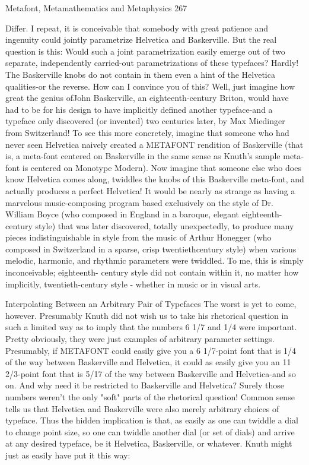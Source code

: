 Metafont, Metamathematics and Metaphysics                                                 267

Differ. I repeat, it is conceivable that somebody with great patience and ingenuity could
jointly parametrize Helvetica and Baskerville. But the real question is this: Would such a
joint parametrization easily emerge out of two separate, independently carried-out
parametrizations of these typefaces?
   Hardly! The Baskerville knobs do not contain in them even a hint of the Helvetica
qualities-or the reverse. How can I convince you of this? Well, just imagine how great the
genius ofJohn Baskerville, an eighteenth-century Briton, would have had to be for his
design to have implicitly defined another typeface-and a typeface only discovered (or
invented) two centuries later, by Max Miedinger from Switzerland! To see this more
concretely, imagine that someone who had never seen Helvetica naively created a
METAFONT rendition of Baskerville (that is, a meta-font centered on Baskerville in the
same sense as Knuth's sample meta-font is centered on Monotype Modern). Now imagine
that someone else who does know Helvetica comes along, twiddles the knobs of this
Baskerville meta-font, and actually produces a perfect Helvetica! It would be nearly as
strange as having a marvelous music-composing program based exclusively on the style
of Dr. William Boyce (who composed in England in a baroque, elegant eighteenth-
century style) that was later discovered, totally unexpectedly, to produce many pieces
indistinguishable in style from the music of Arthur Honegger (who composed in
Switzerland in a sparse, crisp twentiethcentury style) when various melodic, harmonic,
and rhythmic parameters were twiddled. To me, this is simply inconceivable; eighteenth-
century style did not contain within it, no matter how implicitly, twentieth-century style -
whether in music or in visual arts.

           Interpolating Between an Arbitrary Pair of Typefaces
   The worst is yet to come, however. Presumably Knuth did not wish us to take his
rhetorical question in such a limited way as to imply that the numbers 6 1/7 and 1/4 were
important. Pretty obviously, they were just examples of arbitrary parameter settings.
Presumably, if METAFONT could easily give you a 6 1/7-point font that is 1/4 of the
way between Baskerville and Helvetica, it could as easily give you an 11 2/3-point font
that is 5/17 of the way between Baskerville and Helvetica-and so on. And why need it be
restricted to Baskerville and Helvetica? Surely those numbers weren't the only "soft"
parts of the rhetorical question! Common sense tells us that Helvetica and Baskerville
were also merely arbitrary choices of typeface. Thus the hidden implication is that, as
easily as one can twiddle a dial to change point size, so one can twiddle another dial (or
set of dials) and arrive at any desired typeface, be it Helvetica, Baskerville, or whatever.
Knuth might just as easily have put it this way:

